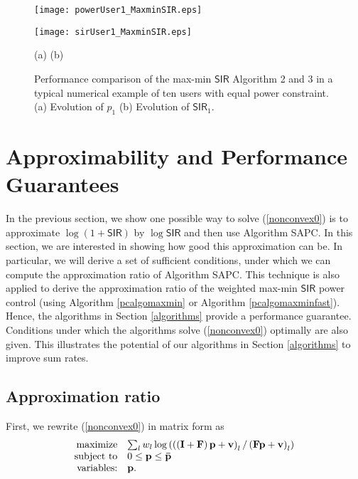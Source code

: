 \documentclass[10pt,twocolumn]{IEEEtran}
\newcommand{\0}{\mathbf{0}}
\newcommand{\1}{\mathbf{1}}
\begin{document}
\begin{figure}
\begin{minipage}[t]{1.7in}
\begin{center}
\texttt{[image: powerUser1\_MaxminSIR.eps]}
\end{center}
\end{minipage}
\begin{minipage}[t]{1.7in}
\begin{center}
\texttt{[image: sirUser1\_MaxminSIR.eps]}
\end{center}
\end{minipage}
\begin{center}
(a) \hspace{1.5in} (b)
\end{center}
\caption{\scriptsize{Performance comparison of the max-min $\mathsf{SIR}$ Algorithm 2 and 3 in a typical numerical example of ten users with equal power constraint. (a) Evolution of $p_1$ (b) Evolution of $\mathsf{SIR}_1$. }} \label{fig2}
\end{figure}

\section{Approximability and Performance Guarantees}
\label{perf}
In the previous section, we show one possible way to solve (\ref{nonconvex0}) is to approximate $\log(1+\mathsf{SIR})$ by $\log \mathsf{SIR}$ and then use Algorithm SAPC. In this section, we are interested in showing how good this approximation can be. In particular, we will derive a set of sufficient conditions, under which we can compute the approximation ratio of Algorithm SAPC. This technique is also applied to derive the approximation ratio of the weighted max-min $\mathsf{SIR}$ power control (using Algorithm \ref{pcalgomaxmin} or Algorithm \ref{pcalgomaxminfast}). Hence, the algorithms in Section \ref{algorithms} provide a performance guarantee. Conditions under which the algorithms solve (\ref{nonconvex0}) optimally are also given. This illustrates the potential of our algorithms in Section \ref{algorithms} to improve sum rates.

\subsection{Approximation ratio}
\label{approxratio}
First, we rewrite (\ref{nonconvex0}) in matrix form as
\begin{equation}
\label{nonconvexmatrix0}
\begin{array}
[c]{rl}
\mbox{maximize} & \sum_l w_l \log\left(\left(\left(\mathbf{I}+\mathbf{F}\right)\mathbf{p}+\mathbf{v}\right)_l/\left(\mathbf{F}\mathbf{p}+\mathbf{v}\right)_l\right)\\
\mbox{subject to} & 0 \le \mathbf{p} \le \mathbf{\bar{p}} \\
\mbox{variables:} & \mathbf{p}.
\end{array}
\end{equation}
\end{document}
